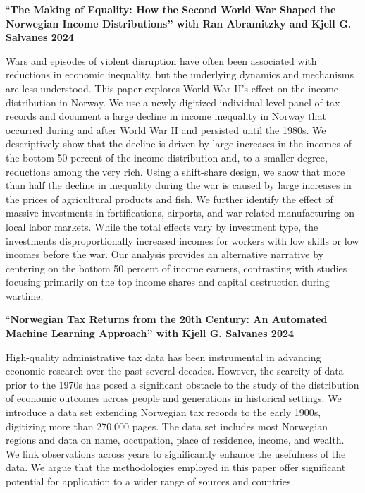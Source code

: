 \documentclass[11pt,]{article}
\begin{document}
``\textbf{The Making of Equality: How the Second World War Shaped the
Norwegian Income Distributions'' with Ran Abramitzky and Kjell G.
Salvanes \hfill 2024}

Wars and episodes of violent disruption have often been associated with
reductions in economic inequality, but the underlying dynamics and
mechanisms are less understood. This paper explores World War II's
effect on the income distribution in Norway. We use a newly digitized
individual-level panel of tax records and document a large decline in
income inequality in Norway that occurred during and after World War II
and persisted until the 1980s. We descriptively show that the decline is
driven by large increases in the incomes of the bottom 50 percent of the
income distribution and, to a smaller degree, reductions among the very
rich. Using a shift-share design, we show that more than half the
decline in inequality during the war is caused by large increases in the
prices of agricultural products and fish. We further identify the effect
of massive investments in fortifications, airports, and war-related
manufacturing on local labor markets. While the total effects vary by
investment type, the investments disproportionally increased incomes for
workers with low skills or low incomes before the war. Our analysis
provides an alternative narrative by centering on the bottom 50 percent
of income earners, contrasting with studies focusing primarily on the
top income shares and capital destruction during wartime.
\vspace{0.3cm}\vspace{-0.2cm}

``\textbf{Norwegian Tax Returns from the 20th Century: An Automated
Machine Learning Approach'' with Kjell G. Salvanes \hfill 2024}

High-quality administrative tax data has been instrumental in advancing
economic research over the past several decades. However, the scarcity
of data prior to the 1970s has posed a significant obstacle to the study
of the distribution of economic outcomes across people and generations
in historical settings. We introduce a data set extending Norwegian tax
records to the early 1900s, digitizing more than 270,000 pages. The data
set includes most Norwegian regions and data on name, occupation, place
of residence, income, and wealth. We link observations across years to
significantly enhance the usefulness of the data. We argue that the
methodologies employed in this paper offer significant potential for
application to a wider range of sources and countries.
\vspace{0.3cm}\vspace{-0.2cm}
\end{document}
